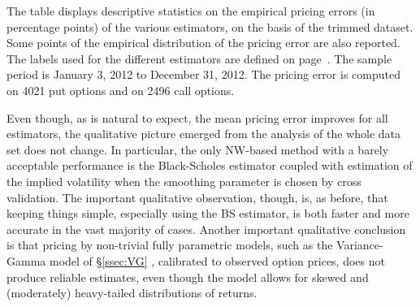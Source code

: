 \documentclass[11pt]{article}
\theoremstyle{remark}
\begin{document}
\begin{table}[tbp]
\caption{Pricing errors on the trimmed dataset}
\begin{center}
\vspace{2mm}
\parbox{\textwidth}{\footnotesize The table displays descriptive
  statistics on the empirical pricing errors (in percentage points) of
  the various estimators, on the basis of the trimmed dataset. Some
  points of the empirical distribution of the pricing error are also
  reported.  The labels used for the different estimators are defined
  on page~\pageref{etichette}. The sample period is January 3, 2012 to
  December 31, 2012. The pricing error is computed on 4021 put options
  and on 2496 call options. \vspace{4mm}}
\footnotesize{{}}
\end{center}
\label{table3}
\end{table}

Even though, as is natural to expect, the mean pricing error improves
for all estimators, the qualitative picture emerged from the analysis
of the whole data set does not change. In particular, the only
NW-based method with a barely acceptable performance is the
Black-Scholes estimator coupled with estimation of the implied
volatility when the smoothing parameter is chosen by cross
validation. The important qualitative observation, though, is, as
before, that keeping things simple, especially using the BS estimator,
is both faster and more accurate in the vast majority of
cases. Another important qualitative conclusion is that pricing by
non-trivial fully parametric models, such as the Variance-Gamma model
of \S\ref{ssec:VG} , calibrated to observed option prices, does not
produce reliable estimates, even though the model allows for skewed
and (moderately) heavy-tailed distributions of returns.



\end{document}
